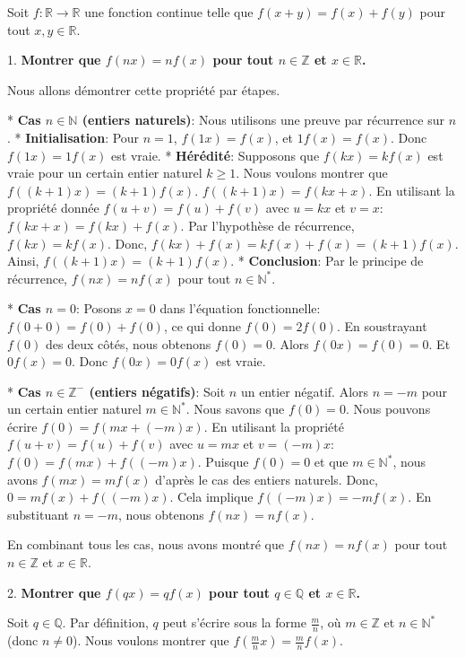 \documentclass[12pt,a4paper]{report}
\begin{document}
Soit $f: \mathbb{R} \to \mathbb{R}$ une fonction continue telle que $f(x+y) = f(x) + f(y)$ pour tout $x, y \in \mathbb{R}$.

1.  \textbf{Montrer que $f(nx) = nf(x)$ pour tout $n \in \mathbb{Z}$ et $x \in \mathbb{R}$.}

    Nous allons démontrer cette propriété par étapes.

    *   \textbf{Cas $n \in \mathbb{N}$ (entiers naturels)}:
        Nous utilisons une preuve par récurrence sur $n$.
        *   \textbf{Initialisation}: Pour $n=1$, $f(1x) = f(x)$, et $1f(x) = f(x)$. Donc $f(1x) = 1f(x)$ est vraie.
        *   \textbf{Hérédité}: Supposons que $f(kx) = kf(x)$ est vraie pour un certain entier naturel $k \ge 1$.
            Nous voulons montrer que $f((k+1)x) = (k+1)f(x)$.
            $f((k+1)x) = f(kx + x)$.
            En utilisant la propriété donnée $f(u+v) = f(u) + f(v)$ avec $u=kx$ et $v=x$:
            $f(kx + x) = f(kx) + f(x)$.
            Par l'hypothèse de récurrence, $f(kx) = kf(x)$.
            Donc, $f(kx) + f(x) = kf(x) + f(x) = (k+1)f(x)$.
            Ainsi, $f((k+1)x) = (k+1)f(x)$.
        *   \textbf{Conclusion}: Par le principe de récurrence, $f(nx) = nf(x)$ pour tout $n \in \mathbb{N}^*$.

    *   \textbf{Cas $n=0$}:
        Posons $x=0$ dans l'équation fonctionnelle: $f(0+0) = f(0) + f(0)$, ce qui donne $f(0) = 2f(0)$.
        En soustrayant $f(0)$ des deux côtés, nous obtenons $f(0) = 0$.
        Alors $f(0x) = f(0) = 0$. Et $0f(x) = 0$.
        Donc $f(0x) = 0f(x)$ est vraie.

    *   \textbf{Cas $n \in \mathbb{Z}^-$ (entiers négatifs)}:
        Soit $n$ un entier négatif. Alors $n = -m$ pour un certain entier naturel $m \in \mathbb{N}^*$.
        Nous savons que $f(0) = 0$.
        Nous pouvons écrire $f(0) = f(mx + (-m)x)$.
        En utilisant la propriété $f(u+v) = f(u) + f(v)$ avec $u=mx$ et $v=(-m)x$:
        $f(0) = f(mx) + f((-m)x)$.
        Puisque $f(0)=0$ et que $m \in \mathbb{N}^*$, nous avons $f(mx) = mf(x)$ d'après le cas des entiers naturels.
        Donc, $0 = mf(x) + f((-m)x)$.
        Cela implique $f((-m)x) = -mf(x)$.
        En substituant $n = -m$, nous obtenons $f(nx) = nf(x)$.

    En combinant tous les cas, nous avons montré que $f(nx) = nf(x)$ pour tout $n \in \mathbb{Z}$ et $x \in \mathbb{R}$.

2.  \textbf{Montrer que $f(qx) = qf(x)$ pour tout $q \in \mathbb{Q}$ et $x \in \mathbb{R}$.}

    Soit $q \in \mathbb{Q}$. Par définition, $q$ peut s'écrire sous la forme $\frac{m}{n}$, où $m \in \mathbb{Z}$ et $n \in \mathbb{N}^*$ (donc $n \neq 0$).
    Nous voulons montrer que $f\left(\frac{m}{n}x\right) = \frac{m}{n}f(x)$.
\end{document}
